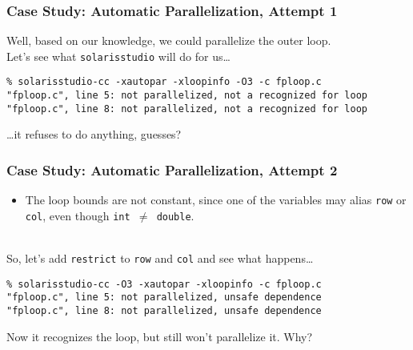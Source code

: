 \documentclass[aspectratio=43]{beamer}
\newenvironment{changemargin}[1]{%
  \begin{list}{}{%
    \setlength{\topsep}{0pt}%
    \setlength{\leftmargin}{#1}%
    \setlength{\rightmargin}{1em}
    \setlength{\listparindent}{\parindent}%
    \setlength{\itemindent}{\parindent}%
    \setlength{\parsep}{\parskip}%
  }%
  \item[]}{\end{list}}
\begin{document}
\begin{frame}[fragile]
  \frametitle{Case Study: Automatic Parallelization, Attempt 1}

  \begin{changemargin}{2.5cm}
  Well, based on our knowledge, we could parallelize the outer loop.\\[1em]
  Let's see what {\tt solarisstudio} will do for us\ldots
  \end{changemargin}

  \begin{lstlisting}
% solarisstudio-cc -xautopar -xloopinfo -O3 -c fploop.c
"fploop.c", line 5: not parallelized, not a recognized for loop
"fploop.c", line 8: not parallelized, not a recognized for loop
  \end{lstlisting}

  \begin{changemargin}{2.5cm}
  \ldots it refuses to do anything, guesses?
  \end{changemargin}

\end{frame}

\begin{frame}[fragile]
  \frametitle{Case Study: Automatic Parallelization, Attempt 2}

\begin{changemargin}{1cm}
  \begin{itemize}
    \item The loop bounds are not constant, since one of the variables may alias
      {\tt row} or {\tt col}, even though {\tt int $\neq$ double}.
  \end{itemize}
~\\[1em]

  So, let's add {\tt restrict} to {\tt row} and {\tt col} and see what
  happens\ldots

  \begin{lstlisting}
% solarisstudio-cc -O3 -xautopar -xloopinfo -c fploop.c
"fploop.c", line 5: not parallelized, unsafe dependence
"fploop.c", line 8: not parallelized, unsafe dependence
  \end{lstlisting}

  Now it recognizes the loop, but still won't parallelize it. Why?
\end{changemargin}

\end{frame}
\end{document}
